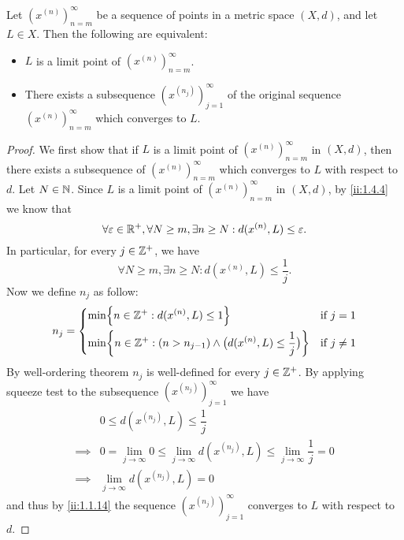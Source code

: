 \begin{prop}\label{ii:1.4.5}
  Let \((x^{(n)})_{n = m}^\infty\) be a sequence of points in a metric space \((X, d)\), and let \(L \in X\).
  Then the following are equivalent:
  \begin{itemize}
    \item \(L\) is a limit point of \((x^{(n)})_{n = m}^\infty\).
    \item There exists a subsequence \((x^{(n_j)})_{j = 1}^\infty\) of the original sequence \((x^{(n)})_{n = m}^\infty\) which converges to \(L\).
  \end{itemize}
\end{prop}

\begin{proof}
  We first show that if \(L\) is a limit point of \((x^{(n)})_{n = m}^\infty\) in \((X, d)\), then there exists a subsequence of \((x^{(n)})_{n = m}^\infty\) which converges to \(L\) with respect to \(d\).
  Let \(N \in \mathbb{N}\).
  Since \(L\) is a limit point of \((x^{(n)})_{n = m}^\infty\) in \((X, d)\), by \cref{ii:1.4.4} we know that
  \[
    \forall \varepsilon \in \mathbb{R}^+, \forall N \geq m, \exists n \geq N : d(x^{(n)}, L) \leq \varepsilon.
  \]
  In particular, for every \(j \in \mathbb{Z}^+\), we have
  \[
    \forall N \geq m, \exists n \geq N : d(x^{(n)}, L) \leq \dfrac{1}{j}.
  \]
  Now we define \(n_j\) as follow:
  \[
    n_j = \begin{dcases}
      \min\set{n \in \Z^+ : d(x^{(n)}, L) \leq 1}                                            & \text{if } j = 1    \\
      \min\set{n \in \Z^+ : (n > n_{j - 1}) \land \big(d(x^{(n)}, L) \leq \dfrac{1}{j}\big)} & \text{if } j \neq 1
    \end{dcases}
  \]
  By well-ordering theorem \(n_j\) is well-defined for every \(j \in \mathbb{Z}^+\).
  By applying squeeze test to the subsequence \((x^{(n_j)})_{j = 1}^\infty\) we have
  \begin{align*}
             & 0 \leq d(x^{(n_j)}, L) \leq \dfrac{1}{j}                                                                     \\
    \implies & 0 = \lim_{j \to \infty} 0 \leq \lim_{j \to \infty} d(x^{(n_j)}, L) \leq \lim_{j \to \infty} \dfrac{1}{j} = 0 \\
    \implies & \lim_{j \to \infty} d(x^{(n_j)}, L) = 0
  \end{align*}
  and thus by \cref{ii:1.1.14} the sequence \((x^{(n_j)})_{j = 1}^\infty\) converges to \(L\) with respect to \(d\).


\end{proof}
